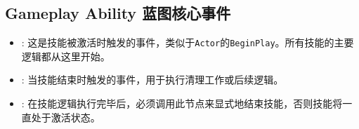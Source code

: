 \documentclass[math,code,10pt,CJKmath]{amznotes}
\begin{document}
\subsection{Gameplay Ability 蓝图核心事件}
\begin{itemize}
    \item {}: 这是技能被激活时触发的事件，类似于\texttt{Actor}的\texttt{BeginPlay}。所有技能的主要逻辑都从这里开始。
    \item {}: 当技能结束时触发的事件，用于执行清理工作或后续逻辑。
    \item {}: 在技能逻辑执行完毕后，必须调用此节点来显式地结束技能，否则技能将一直处于激活状态。
\end{itemize}
\end{document}
